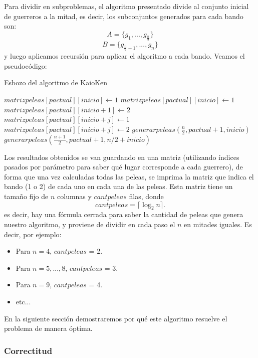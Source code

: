 Para dividir en subproblemas, el algoritmo presentado divide al conjunto inicial de guerreros a la mitad, es decir, los subconjuntos generados para cada bando son:
\[A = \{g_1,...,g_{\frac{n}{2}}\}\] 
\[B = \{g_{\frac{n}{2}+1},...,g_n\}\]
y luego aplicamos recursión para aplicar el algoritmo a cada bando. Veamos el pseudocódigo:

\begin{algorithm}
\begin{algorithmic}
\caption{Esbozo del algoritmo de KaioKen}
    \State $matrizpeleas[pactual][inicio] \gets 1$
  \EndIf
    \State $matrizpeleas[pactual][inicio] \gets 1$
    \State $matrizpeleas[pactual][inicio + 1] \gets 2$
  \Else
    \For {$j \in [0,..., n)$}
        \State $matrizpeleas[pactual][inicio + j] \gets 1$
      \Else 
        \State $matrizpeleas[pactual][inicio + j] \gets 2$
      \EndIf
    \EndFor
    \State $generarpeleas(\frac{n}{2}, pactual+1, inicio)$
    \State $generarpeleas(\frac{n+1}{2}, pactual+1, n/2 + inicio)$
  \EndIf
  \EndProcedure
\end{algorithmic}
\end{algorithm}

Los resultados obtenidos se van guardando en una matriz (utilizando índices pasados por parámetro para saber qué lugar corresponde a cada guerrero), de forma que una vez calculadas todas las peleas, se imprima la matriz que indica el bando (1 o 2) de cada uno en cada una de las peleas. Esta matriz tiene un tamaño fijo de $n$ columnas y $cantpeleas$ filas, donde 
\[ cantpeleas = \lceil \log _2 n \rceil. \]
 es decir, hay una fórmula cerrada para saber la cantidad de peleas que genera nuestro algoritmo, y proviene de dividir en cada paso el $n$ en mitades iguales. Es decir, por ejemplo:
\begin{itemize}
\item Para $n = 4$, $cantpeleas$ = 2.
\item Para $n = 5,...,8$, $cantpeleas$ = 3.
\item Para $n = 9$, $cantpeleas$ = 4.
\item etc...
\end{itemize}
En la siguiente sección demostraremos por qué este algoritmo resuelve el problema de manera óptima.

\subsubsection{Correctitud}

